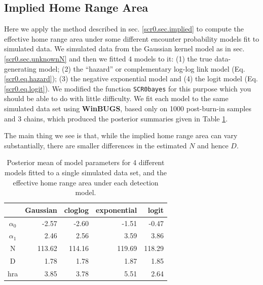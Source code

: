 \subsection{Implied Home Range Area}

Here we apply the method described in sec. \ref{scr0.sec.implied} to
compute the effective home range area under some different encounter
probability models fit to simulated data.
We simulated data from the Gaussian kernel model as in
sec. \ref{scr0.sec.unknownN} and then we fitted 4 models to it: (1)
the true data-generating model; (2) the ``hazard'' or complementary log-log link
model (Eq. \ref{scr0.eq.hazard}); (3) the negative exponential model
and (4) the logit model (Eq. \ref{scr0.eq.logit}).
We modified the function \mbox{\tt  SCR0bayes} for this purpose which
you should be able to do with little difficulty. We fit each model to
the same simulated  data set using {\bf WinBUGS}, based only on 1000
post-burn-in samples and 3 chains, which produced the posterior
summaries given in Table \ref{scr0.tab.implied}.

The main thing we see is that, while the implied home range area can
vary substantially, there
are smaller differences in the estimated $N$ and hence $D$.


\begin{table}
\centering
\caption{
Posterior mean of model parameters for 4 different models fitted to a
single simulated data set,
  and the effective home range area under each detection model.
}
\begin{tabular}{crrrr}
\hline \hline
     &  Gaussian & cloglog &exponential & logit \\  \hline
$\alpha_0$  &  -2.57 &  -2.60 & -1.51 & -0.47 \\
$\alpha_1$  &  2.46  & 2.56  & 3.59  & 3.86 \\
N           & 113.62& 114.16 &119.69& 118.29 \\
D           & 1.78  & 1.78  & 1.87  & 1.85 \\
hra         & 3.85  & 3.78 &  5.51  & 2.64 \\
\hline
\end{tabular}
\label{scr0.tab.implied}
\end{table}



